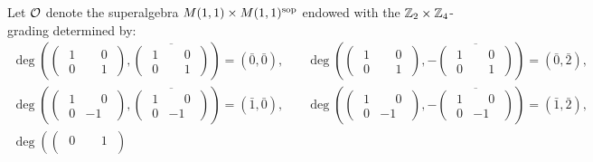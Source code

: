 \begin{ex}\label{ex:superalgebra-O}
	Let $\mathcal O$ denote the superalgebra $M(1,1) \times M(1,1)^{\mathrm{sop}}$ endowed with the $\mathbb{Z}_2\times \mathbb{Z}_4$-grading determined by: 
	\begin{align*}
		\deg \left(\begin{pmatrix}
			\phantom{.}1 & \phantom{-}0\phantom{.} \\
			\phantom{.}0 & \phantom{-}1\phantom{.}
		\end{pmatrix}, \overline{\begin{pmatrix}
				\phantom{.}1 & \phantom{-}0\phantom{.} \\
				\phantom{.}0 & \phantom{-}1\phantom{.}
			\end{pmatrix}}\right) = (\bar 0, \bar 0),\quad &
		\deg \left(\begin{pmatrix}
			\phantom{.}1 & \phantom{-}0\phantom{.} \\
			\phantom{.}0 & \phantom{-}1\phantom{.}
		\end{pmatrix}, -\overline{\begin{pmatrix}
				\phantom{.}1 & \phantom{-}0\phantom{.} \\
				\phantom{.}0 & \phantom{-}1\phantom{.}
			\end{pmatrix}}\right) = (\bar 0, \bar 2),    \\
		\deg \left(\begin{pmatrix}
			\phantom{.}1 & \phantom{-}0\phantom{.} \\
			\phantom{.}0 & -1\phantom{.}
		\end{pmatrix}, \overline{\begin{pmatrix}
				\phantom{.}1 & \phantom{-}0\phantom{.} \\
				\phantom{.}0 & -1\phantom{.}
			\end{pmatrix}}\right) = (\bar 1, \bar 0),\quad &
		\deg \left(\begin{pmatrix}
			\phantom{.}1 & \phantom{-}0\phantom{.} \\
			\phantom{.}0 & -1\phantom{.}
		\end{pmatrix}, -\overline{\begin{pmatrix}
				\phantom{.}1 & \phantom{-}0\phantom{.} \\
				\phantom{.}0 & -1\phantom{.}
			\end{pmatrix}}\right) = (\bar 1, \bar 2),    \\
		\deg \left(\begin{pmatrix}
			\phantom{.}0 & \phantom{-}1\phantom{.} \\

\end{pmatrix}
\end{align*}
\end{ex}
